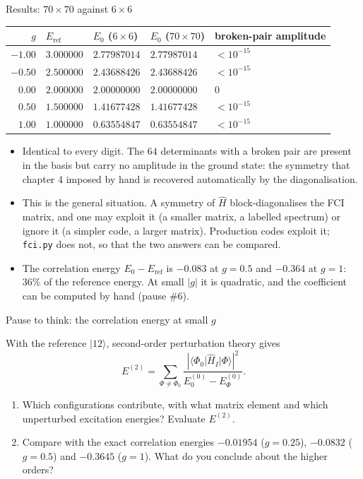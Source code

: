 \documentclass[aspectratio=169,10pt]{beamer}
\newcounter{thinkctr}
\newcommand{\thinkq}[2]{%
  \stepcounter{thinkctr}%
  \begin{tcolorbox}[colback=palewarm,colframe=warm,title={\bfseries Pause to think \#\thethinkctr\hfill\mdseries\small(about #1 min -- discuss with your neighbour)},fonttitle=\bfseries]
  #2
  \end{tcolorbox}}
\newcommand{\ket}[1]{\vert #1\rangle}
\newcommand{\element}[3]{\langle #1\vert #2\vert #3\rangle}
\begin{document}
\begin{frame}{Results: $70\times70$ against $6\times6$}
  \small
  \begin{center}
  \renewcommand{\arraystretch}{1.15}
  \begin{tabular}{rllll}
    \toprule
    $g$ & $E_{\mathrm{ref}}$ & $E_0$ ($6\times6$) & $E_0$ ($70\times70$) & broken-pair amplitude\\
    \midrule
    $-1.00$ & $3.000000$ & $2.77987014$ & $2.77987014$ & $<10^{-15}$\\
    $-0.50$ & $2.500000$ & $2.43688426$ & $2.43688426$ & $<10^{-15}$\\
    $0.00$  & $2.000000$ & $2.00000000$ & $2.00000000$ & $0$\\
    $0.50$  & $1.500000$ & $1.41677428$ & $1.41677428$ & $<10^{-15}$\\
    $1.00$  & $1.000000$ & $0.63554847$ & $0.63554847$ & $<10^{-15}$\\
    \bottomrule
  \end{tabular}
  \end{center}
  \begin{itemize}
    \item Identical to every digit. The $64$ determinants with a broken pair are present in the basis but carry no amplitude in the ground state: the symmetry that chapter 4 imposed by hand is \alert{recovered automatically} by the diagonalisation.
    \item This is the general situation. A symmetry of $\hat{H}$ block-diagonalises the FCI matrix, and one may exploit it (a smaller matrix, a labelled spectrum) or ignore it (a simpler code, a larger matrix). Production codes exploit it; \texttt{fci.py} does not, so that the two answers can be compared.
    \item The correlation energy $E_0-E_{\mathrm{ref}}$ is $-0.083$ at $g=0.5$ and $-0.364$ at $g=1$: $36\%$ of the reference energy. At small $|g|$ it is quadratic, and the coefficient can be computed by hand (pause \#6).
  \end{itemize}
\end{frame}

\begin{frame}{Pause to think: the correlation energy at small $g$}
  \thinkq{4}{With the reference $\ket{12}$, second-order perturbation theory gives
  \[
    E^{(2)}=\sum_{\Phi\neq\Phi_0}\frac{|\element{\Phi_0}{\hat{H}_I}{\Phi}|^2}{E_0^{(0)}-E_\Phi^{(0)}} .
  \]
  \begin{enumerate}
    \item Which configurations contribute, with what matrix element and which unperturbed excitation energies? Evaluate $E^{(2)}$.
    \item Compare with the exact correlation energies $-0.01954$ ($g=0.25$), $-0.0832$ ($g=0.5$) and $-0.3645$ ($g=1$). What do you conclude about the higher orders?
  \end{enumerate}}
\end{frame}
\end{document}
